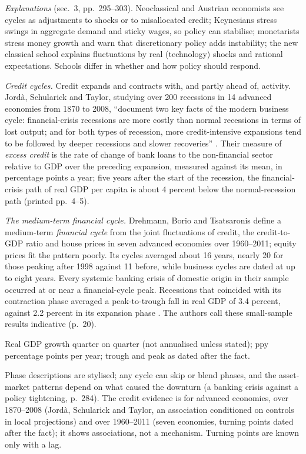 \begin{qfdefinition}
\emph{Explanations} (sec.~3, pp.~295--303). Neoclassical and Austrian economists see cycles as adjustments to shocks or to misallocated credit; Keynesians stress swings in aggregate demand and sticky wages, so policy can stabilise; monetarists stress money growth and warn that discretionary policy adds instability; the new classical school explains fluctuations by real (technology) shocks and rational expectations. Schools differ in whether and how policy should respond.

\emph{Credit cycles.} Credit expands and contracts with, and partly ahead of, activity. Jord\`a, Schularick and Taylor, studying over 200 recessions in 14 advanced economies from 1870 to 2008, ``document two key facts of the modern business cycle: financial-crisis recessions are more costly than normal recessions in terms of lost output; and for both types of recession, more credit-intensive expansions tend to be followed by deeper recessions and slower recoveries'' \citep[abstract]{jorda-schularick-taylor-2011}. Their measure of \emph{excess credit} is the rate of change of bank loans to the non-financial sector relative to GDP over the preceding expansion, measured against its mean, in percentage points a year; five years after the start of the recession, the financial-crisis path of real GDP per capita is about 4 percent below the normal-recession path (printed pp.~4--5).

\emph{The medium-term financial cycle.} Drehmann, Borio and Tsatsaronis define a medium-term \emph{financial cycle} from the joint fluctuations of credit, the credit-to-GDP ratio and house prices in seven advanced economies over 1960--2011; equity prices fit the pattern poorly. Its cycles averaged about 16 years, nearly 20 for those peaking after 1998 against 11 before, while business cycles are dated at up to eight years. Every systemic banking crisis of domestic origin in their sample occurred at or near a financial-cycle peak. Recessions that coincided with its contraction phase averaged a peak-to-trough fall in real GDP of 3.4 percent, against 2.2 percent in its expansion phase \citep[printed pp.~2, 16--20, Tables~8--9]{financial-cycle-medium-term-2012}. The authors call these small-sample results indicative (p.~20).

 Real GDP growth quarter on quarter (not annualised unless stated); ppy percentage points per year; trough and peak as dated after the fact.

 Phase descriptions are stylised; any cycle can skip or blend phases, and the asset-market patterns depend on what caused the downturn (a banking crisis against a policy tightening, p.~284). The credit evidence is for advanced economies, over 1870--2008 (Jord\`a, Schularick and Taylor, an association conditioned on controls in local projections) and over 1960--2011 (seven economies, turning points dated after the fact); it shows associations, not a mechanism. Turning points are known only with a lag.


\end{qfdefinition}

